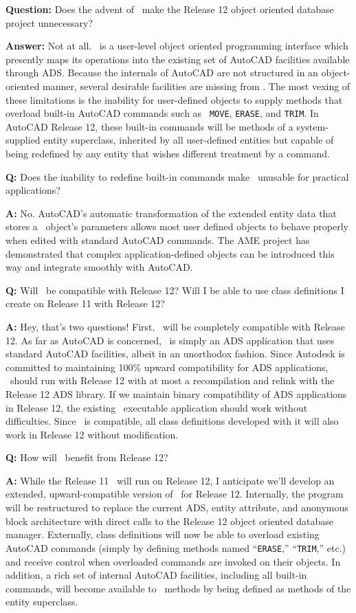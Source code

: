 \documentclass{article}
\begin{document}
{\bf Question:} Does the advent of \cw\ make the Release 12 object
oriented database project unnecessary?

{\bf Answer:} Not at all.  \cw\ is a user-level object oriented
programming interface which presently maps its operations into the
existing set of AutoCAD facilities available through ADS\@.  Because
the internals of AutoCAD are not structured in an object-oriented
manner, several desirable facilities are missing from \cw .  The most
vexing of these limitations is the inability for user-defined objects
to supply methods that overload built-in AutoCAD commands such as {\tt
MOVE}, {\tt ERASE}, and {\tt TRIM}\@.  In AutoCAD Release 12, these
built-in commands will be methods of a system-supplied entity
superclass, inherited by all user-defined entities but capable of
being redefined by any entity that wishes different treatment by a
command.

{\bf Q:}  Does the inability to redefine built-in commands
make \cw\ unusable for practical applications?

{\bf A:}  No.  AutoCAD's automatic transformation of the extended
entity data that stores a \cw\ object's parameters allows most
user defined objects to behave properly when edited with standard
AutoCAD commands.  The AME project has demonstrated that complex
application-defined objects can be introduced this way and integrate
smoothly with AutoCAD\@.

{\bf Q:}  Will \cw\ be compatible with Release 12?  Will I be able to
use class definitions I create on Release 11 with Release 12?

{\bf A:}  Hey, that's two questions!  First, \cw\ will be completely
compatible with Release 12.  As far as AutoCAD is concerned, \cw\ is
simply an ADS application that uses standard AutoCAD facilities,
albeit in an unorthodox fashion.  Since Autodesk is committed to
maintaining 100\% upward compatibility for ADS applications, \cw\
should run with Release 12 with at most a recompilation and relink
with the Release 12 ADS library.  If we maintain binary compatibility
of ADS applications in Release 12, the existing \cw\ executable
application should work without difficulties.  Since \cw\ is
compatible, all class definitions developed with it will also work in
Release 12 without modification.

{\bf Q:} How will \cw\ benefit from Release 12?

{\bf A:} While the Release 11 \cw\ will run on Release 12, I
anticipate we'll develop an extended, upward-compatible version of
\cw\ for Release 12.  Internally, the program will be restructured to
replace the current ADS, entity attribute, and anonymous block
architecture with direct calls to the Release 12 object oriented
database manager.  Externally, class definitions will now be able to
overload existing AutoCAD commands (simply by defining methods named
``{\tt ERASE},'' ``{\tt TRIM},'' etc.)
and receive control when overloaded
commands are invoked on their objects.  In addition, a rich set of
internal AutoCAD facilities, including all built-in commands, will
become available to \cw\ methods by being defined as methods of the
entity superclass.
\end{document}

